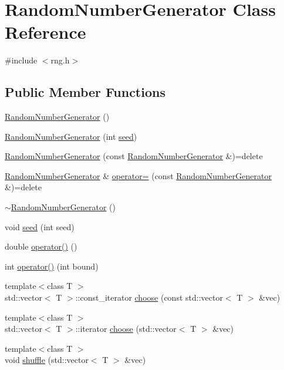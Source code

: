 \hypertarget{classRandomNumberGenerator}{\section{Random\-Number\-Generator Class Reference}
\label{classRandomNumberGenerator}
}


{\ttfamily \#include $<$rng.\-h$>$}

\subsection*{Public Member Functions}
\begin{DoxyCompactItemize}
\item 
\hyperlink{classRandomNumberGenerator_a8e7e711ea58f13f3ed95becbe33684e9}{Random\-Number\-Generator} ()
\item 
\hyperlink{classRandomNumberGenerator_aad6093b84afbbd4035ca212aa6db9353}{Random\-Number\-Generator} (int \hyperlink{classRandomNumberGenerator_acfbecc34525561920a9c5199fe48673a}{seed})
\item 
\hyperlink{classRandomNumberGenerator_a5567db9a0e079b2188d0800c9d065f33}{Random\-Number\-Generator} (const \hyperlink{classRandomNumberGenerator}{Random\-Number\-Generator} \&)=delete
\item 
\hyperlink{classRandomNumberGenerator}{Random\-Number\-Generator} \& \hyperlink{classRandomNumberGenerator_aca181ea227eecad35f2eba39c1a75459}{operator=} (const \hyperlink{classRandomNumberGenerator}{Random\-Number\-Generator} \&)=delete
\item 
\hyperlink{classRandomNumberGenerator_af4949b4234bd8d8283028162f8a8e7f5}{$\sim$\-Random\-Number\-Generator} ()
\item 
void \hyperlink{classRandomNumberGenerator_acfbecc34525561920a9c5199fe48673a}{seed} (int seed)
\item 
double \hyperlink{classRandomNumberGenerator_af24ebb29a219641d8234ae178010cfaa}{operator()} ()
\item 
int \hyperlink{classRandomNumberGenerator_aa2a4a0a8b903b39eed19953f542e9ce8}{operator()} (int bound)
\item 
{\footnotesize template$<$class T $>$ }\\std\-::vector$<$ T $>$\-::const\-\_\-iterator \hyperlink{classRandomNumberGenerator_a9d8504466d72cc3b06c1450b7d60cb22}{choose} (const std\-::vector$<$ T $>$ \&vec)
\item 
{\footnotesize template$<$class T $>$ }\\std\-::vector$<$ T $>$\-::iterator \hyperlink{classRandomNumberGenerator_a15e94bb4c22d07569c0864029f76213c}{choose} (std\-::vector$<$ T $>$ \&vec)
\item 
{\footnotesize template$<$class T $>$ }\\void \hyperlink{classRandomNumberGenerator_ae9ac233ae41471a32afd3524322b885a}{shuffle} (std\-::vector$<$ T $>$ \&vec)
\end{DoxyCompactItemize}


